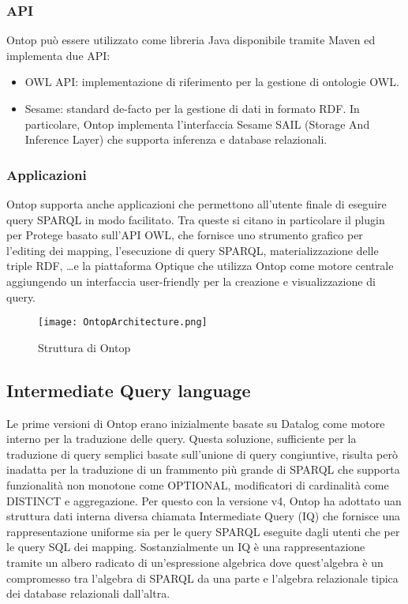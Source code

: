 \subsubsection*{API}
Ontop può essere utilizzato come libreria Java disponibile tramite Maven ed implementa due API:
\begin{itemize}
    \item OWL API: implementazione di riferimento per la gestione di ontologie OWL.
    \item Sesame: standard de-facto per la gestione di dati in formato RDF. In particolare, Ontop implementa l'interfaccia Sesame SAIL (Storage And Inference Layer) che supporta 
        inferenza e database relazionali.
\end{itemize}
\subsubsection*{Applicazioni}
Ontop supporta anche applicazioni che permettono all'utente finale di eseguire query SPARQL in modo facilitato. Tra queste si citano in particolare il plugin per Protege basato sull'API OWL,
che fornisce uno strumento grafico per l'editing dei mapping, l'esecuzione di query SPARQL, materializzazione delle triple RDF, \dots e la piattaforma Optique che utilizza Ontop come motore centrale 
aggiungendo un interfaccia user-friendly per la creazione e visualizzazione di query.

\begin{figure}[ht]
    \centering
    \texttt{[image: OntopArchitecture.png]}
    \caption{Struttura di Ontop}
    \label{fig:OntopArchitecture}
\end{figure}

\subsection{Intermediate Query language}
\label{sec:ontop_iq}
Le prime versioni di Ontop erano inizialmente basate su Datalog come motore interno per la traduzione delle query. 
Questa soluzione, sufficiente per la traduzione di query semplici basate sull'unione di query congiuntive, risulta però inadatta per la traduzione di un frammento più grande di SPARQL 
che supporta funzionalità non monotone come OPTIONAL, modificatori di cardinalità come DISTINCT e aggregazione. Per questo con la versione v4, Ontop ha adottato uan struttura dati interna diversa 
chiamata Intermediate Query (IQ) che fornisce una rappresentazione uniforme sia per le query SPARQL eseguite dagli utenti che per le query SQL dei mapping.
Sostanzialmente un IQ è una rappresentazione tramite un albero radicato di un'espressione algebrica dove quest'algebra è un compromesso tra l'algebra di SPARQL da una parte e l'algebra relazionale tipica 
dei database relazionali dall'altra. \cite{Ontop}

